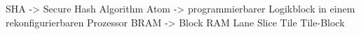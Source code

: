 SHA -> Secure Hash Algorithm
Atom -> programmierbarer Logikblock in einem rekonfigurierbaren Prozessor
BRAM -> Block RAM
Lane
Slice
Tile
Tile-Block